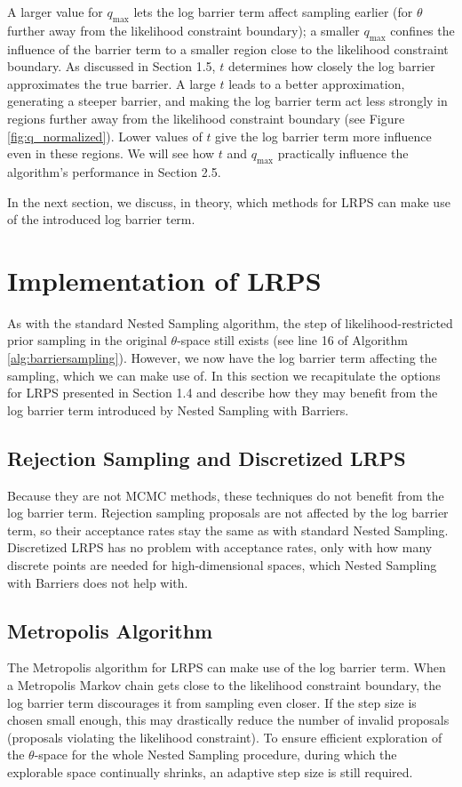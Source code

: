 \documentclass[12pt, a4paper]{report}
\begin{document}
A larger value for $q_{\textrm{max}}$ lets the log barrier term affect sampling earlier (for $\theta$ further away from the likelihood constraint boundary); a smaller $q_{\textrm{max}}$ confines the influence of the barrier term to a smaller region close to the likelihood constraint boundary.
As discussed in Section 1.5, $t$ determines how closely the log barrier approximates the true barrier.
A large $t$ leads to a better approximation, generating a steeper barrier, and making the log barrier term act less strongly in regions further away from the likelihood constraint boundary (see Figure \ref{fig:q_normalized}).
Lower values of $t$ give the log barrier term more influence even in these regions.
We will see how $t$ and $q_{\textrm{max}}$ practically influence the algorithm's performance in Section 2.5.

In the next section, we discuss, in theory, which methods for LRPS can make use of the introduced log barrier term.

\section{Implementation of LRPS}
As with the standard Nested Sampling algorithm, the step of likelihood-restricted prior sampling in the original $\theta$-space still exists (see line 16 of Algorithm \ref{alg:barriersampling}).
However, we now have the log barrier term affecting the sampling, which we can make use of.
In this section we recapitulate the options for LRPS presented in Section 1.4 and describe how they may benefit from the log barrier term introduced by Nested Sampling with Barriers.

\subsection{Rejection Sampling and Discretized LRPS}
Because they are not MCMC methods, these techniques do not benefit from the log barrier term.
Rejection sampling proposals are not affected by the log barrier term, so their acceptance rates stay the same as with standard Nested Sampling.
Discretized LRPS has no problem with acceptance rates, only with how many discrete points are needed for high-dimensional spaces, which Nested Sampling with Barriers does not help with.

\subsection{Metropolis Algorithm}
The Metropolis algorithm for LRPS can make use of the log barrier term.
When a Metropolis Markov chain gets close to the likelihood constraint boundary, the log barrier term discourages it from sampling even closer.
If the step size is chosen small enough, this may drastically reduce the number of invalid proposals (proposals violating the likelihood constraint).
To ensure efficient exploration of the $\theta$-space for the whole Nested Sampling procedure, during which the explorable space continually shrinks, an adaptive step size is still required.
\end{document}
